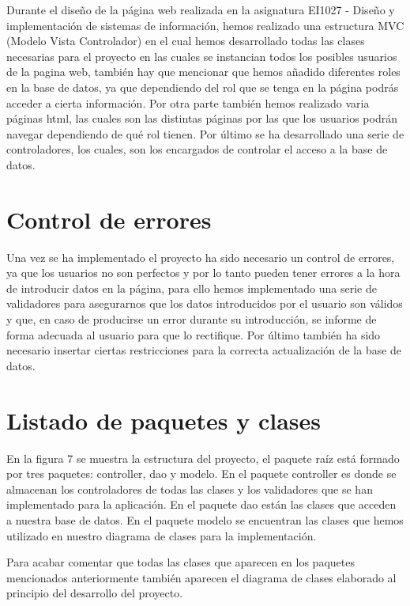 \documentclass[pdftex,11pt,a4paper]{book}
\begin{document}
Durante el diseño de la página web realizada en la asignatura EI1027 - Diseño y implementación de sistemas de información, hemos realizado una estructura MVC (Modelo Vista Controlador) en el cual hemos desarrollado todas las clases necesarias para el proyecto en las cuales se instancian todos los posibles usuarios de la pagina web, también hay que mencionar que hemos añadido diferentes roles en la base de datos, ya que dependiendo del rol que se tenga en la página podrás acceder a cierta información. Por otra parte también hemos realizado varia páginas html, las cuales son las distintas páginas por las que los usuarios podrán navegar dependiendo de qué rol tienen. Por último se ha desarrollado una serie de controladores, los cuales, son los encargados de controlar el acceso a la base de datos.
\section{Control de errores}

Una vez se ha implementado el proyecto ha sido necesario un control de errores, ya que los usuarios no son perfectos y por lo tanto pueden tener errores a la hora de introducir datos en la página, para ello hemos implementado una serie de validadores para asegurarnos que los datos introducidos por el usuario son válidos y que, en caso de producirse un error durante su introducción, se informe de forma adecuada al usuario para que lo rectifique. Por último también ha sido necesario insertar ciertas restricciones para la correcta actualización de la base de datos. 

\section{Listado de paquetes y clases}

En la figura 7 se muestra la estructura del proyecto, el paquete raíz está formado por tres paquetes: controller, dao y modelo.
En el paquete controller es donde se almacenan los controladores de todas las clases y los validadores que se han implementado para la aplicación.
En el paquete dao están las clases que acceden a nuestra base de datos.
En el paquete modelo se encuentran las clases que hemos utilizado en nuestro diagrama de clases para la implementación.

Para acabar comentar que todas las clases que aparecen en los paquetes mencionados anteriormente también aparecen el diagrama de clases elaborado al principio del desarrollo del proyecto.
\end{document}
